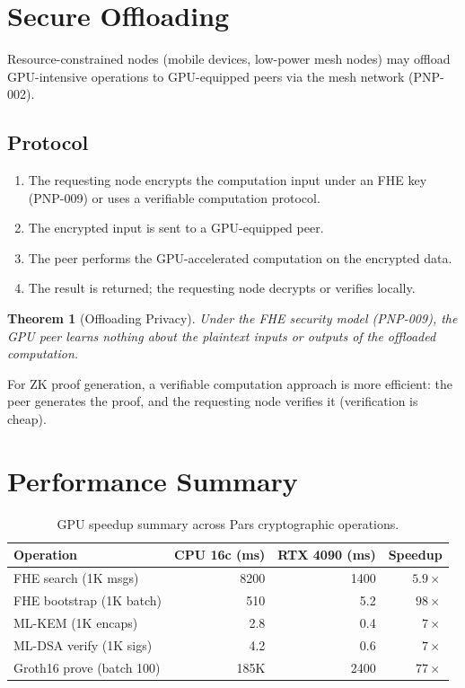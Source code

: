 \documentclass[11pt,a4paper]{article}
\newtheorem{theorem}{Theorem}[section]
\begin{document}
\section{Secure Offloading}
\label{sec:offloading}

Resource-constrained nodes (mobile devices, low-power mesh nodes) may
offload GPU-intensive operations to GPU-equipped peers via the mesh
network (PNP-002).

\subsection{Protocol}

\begin{enumerate}
    \item The requesting node encrypts the computation input under an
    FHE key (PNP-009) or uses a verifiable computation protocol.
    \item The encrypted input is sent to a GPU-equipped peer.
    \item The peer performs the GPU-accelerated computation on the
    encrypted data.
    \item The result is returned; the requesting node decrypts or
    verifies locally.
\end{enumerate}

\begin{theorem}[Offloading Privacy]
    Under the FHE security model (PNP-009), the GPU peer learns nothing
    about the plaintext inputs or outputs of the offloaded computation.
\end{theorem}

For ZK proof generation, a verifiable computation approach is more
efficient: the peer generates the proof, and the requesting node
verifies it (verification is cheap).

\section{Performance Summary}
\label{sec:summary}

\begin{table}[h]
\centering
\caption{GPU speedup summary across Pars cryptographic operations.}
\label{tab:summary}
\begin{tabular}{@{}lrrr@{}}
\toprule
\textbf{Operation} & \textbf{CPU 16c (ms)} & \textbf{RTX 4090 (ms)} & \textbf{Speedup} \\
\midrule
FHE search (1K msgs)     & 8200 & 1400 & $5.9\times$ \\
FHE bootstrap (1K batch) & 510  & 5.2  & $98\times$ \\
ML-KEM (1K encaps)       & 2.8  & 0.4  & $7\times$ \\
ML-DSA verify (1K sigs)  & 4.2  & 0.6  & $7\times$ \\
Groth16 prove (batch 100) & 185K & 2400 & $77\times$ \\
\bottomrule
\end{tabular}
\end{table}
\end{document}
